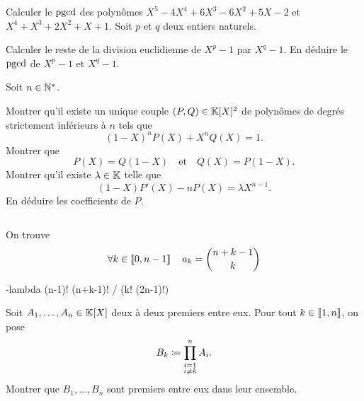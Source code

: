 \documentclass{magnolia}
\begin{document}

\begin{questions}
\question Calculer le $\operatorname{pgcd}$ des polynômes $X^5-4X^4+6X^3-6X^2+5X-2$ et
  $X^4+X^3+2X^2+X+1$.
\question Soit $p$ et $q$ deux entiers naturels.
  \begin{questions}
  \question Calculer le reste de la division euclidienne de $X^p-1$ par
    $X^q-1$.
  \question En déduire le $\operatorname{pgcd}$ de $X^p-1$ et $X^q-1$.
  \end{questions}
\end{questions}



Soit $n\in{\mathbb{N}^*}$.
\begin{questions}
\question Montrer qu'il existe un unique couple $(P,Q)\in\polyK^2$ de polynômes de degrés
  strictement inférieurs à $n$ tels que
  $$(1-X)^n P(X) + X^n Q(X)=1.$$
\question Montrer que
  $$P(X)=Q(1-X) \quad \text{et} \quad Q(X)=P(1-X).$$
\question Montrer qu'il existe $\lambda\in\mathbb{K}$ telle que
  $$(1-X)P'(X)-nP(X)=\lambda X^{n-1}.$$
\question En déduire les coefficients de $P$.
\end{questions}
\begin{sol}
$\quad$
\begin{questions}
\question
\question
\question
\question On trouve
  \[\forall k\in\left\llbracket 0,n-1\right\rrbracket \quad a_k=\binom{n+k-1}{k}\]

  -lambda (n-1)! (n+k-1)! / (k! (2n-1)!)
\end{questions}
\end{sol}

Soit $A_1,\ldots,A_n\in\polyK$ deux à deux premiers entre eux. Pour tout
$k\in\left\llbracket 1,n\right\rrbracket$, on pose
\[B_k\coloneqq \prod_{\substack{i=1\\i\neq k}}^n A_i.\]
Montrer que $B_1,\ldots,B_n$ sont premiers entre eux dans leur ensemble.

\end{document}
